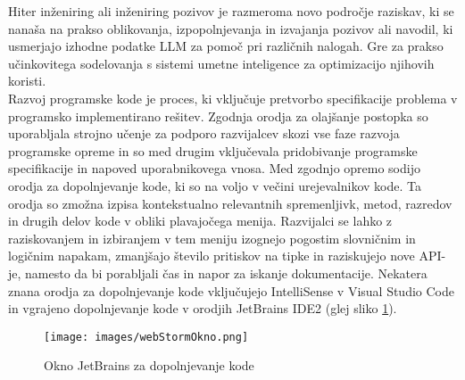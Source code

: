 \documentclass[a4paper,12pt,openright]{book}
\begin{document}
Hiter inženiring ali inženiring pozivov je razmeroma novo področje raziskav, ki se nanaša na prakso oblikovanja, izpopolnjevanja in izvajanja pozivov ali navodil, ki usmerjajo izhodne podatke LLM za pomoč pri različnih nalogah. Gre za prakso učinkovitega sodelovanja s sistemi umetne inteligence za optimizacijo njihovih koristi. \cite{info:doi/10.2196/50638} \\
Razvoj programske kode je proces, ki vključuje pretvorbo specifikacije problema v programsko implementirano rešitev. Zgodnja orodja za olajšanje postopka so uporabljala strojno učenje za podporo razvijalcev skozi vse faze razvoja programske opreme in so med drugim vključevala pridobivanje programske specifikacije in napoved uporabnikovega vnosa.
Med zgodnjo opremo sodijo orodja za dopolnjevanje kode, ki so na voljo v večini urejevalnikov kode. Ta orodja so zmožna izpisa kontekstualno relevantnih spremenljivk, metod, razredov in drugih delov kode v obliki plavajočega menija. Razvijalci se lahko z raziskovanjem in izbiranjem v tem meniju izognejo pogostim slovničnim in logičnim napakam, zmanjšajo število pritiskov na tipke in raziskujejo nove API-je, namesto da bi porabljali čas in napor za iskanje dokumentacije. Nekatera znana orodja za dopolnjevanje kode vključujejo IntelliSense v Visual Studio Code in vgrajeno dopolnjevanje kode v orodjih JetBrains IDE2 (glej sliko \ref{fig:jetBrainsOkno}). \cite{hu2019re} \\
\begin{figure}[H]
    \centering
    \texttt{[image: images/webStormOkno.png]}
    \caption{Okno JetBrains za dopolnjevanje kode}
    \label{fig:jetBrainsOkno}
\end{figure}
\end{document}
